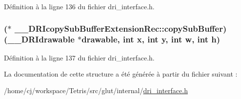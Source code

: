 Définition à la ligne 136 du fichier dri\-\_\-interface.\-h.

\hypertarget{struct_____d_r_icopy_sub_buffer_extension_rec_a0be1cfdf2996b714472ffb0cb5422248}{
\subsubsection[{copy\-Sub\-Buffer}]{($\ast$ \-\_\-\-\_\-\-D\-R\-Icopy\-Sub\-Buffer\-Extension\-Rec\-::copy\-Sub\-Buffer)({\bf \-\_\-\-\_\-\-D\-R\-Idrawable} $\ast$drawable, int {\bf x}, int {\bf y}, int {\bf w}, int {\bf h})}}\label{struct_____d_r_icopy_sub_buffer_extension_rec_a0be1cfdf2996b714472ffb0cb5422248}


Définition à la ligne 137 du fichier dri\-\_\-interface.\-h.



La documentation de cette structure a été générée à partir du fichier suivant \-:\begin{DoxyCompactItemize}
\item 
/home/cj/workspace/\-Tetris/src/glut/internal/\hyperlink{dri__interface_8h}{dri\-\_\-interface.\-h}\end{DoxyCompactItemize}
